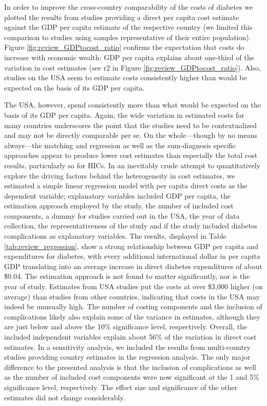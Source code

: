 In order to improve the cross-country comparability of the costs of diabetes we plotted the results from studies providing a direct per capita cost estimate against the \ac{GDP} per capita estimate of the respective country (we limited this comparison to studies using samples representative of their entire population). Figure \ref{fig:review_GDPtocost_ratio} confirms the expectation that costs do increase with economic wealth: \ac{GDP} per capita explains about one-third of the variation in cost estimates (see r2 in Figure \ref{fig:review_GDPtocost_ratio}). Also, studies on the USA seem to estimate costs consistently higher than would be expected on the basis of its \ac{GDP} per capita. 

The USA, however, spend consistently more than what would be expected on the basis of its \ac{GDP} per capita. Again, the wide variation in estimated costs for many countries underscores the point that the studies need to be contextualized and may not be directly comparable per se. On the whole---though by no means always---the matching and regression as well as the sum-diagnosis specific approaches appear to produce lower cost estimates than especially the total cost results, particularly so for \acp{HIC}. In an inevitably crude attempt to quantitatively explore the driving factors behind the heterogeneity in cost estimates, we estimated a simple linear regression model with per capita direct costs as the dependent variable; explanatory variables included \ac{GDP} per capita, the estimation approach employed by the study, the number of included cost components, a dummy for studies carried out in the USA, the year of data collection, the representativeness of the study and if the study included diabetes complications as explanatory variables. The results, displayed in Table \ref{tab:review_regression}, show a strong relationship between \ac{GDP} per capita and expenditures for diabetes, with every additional international dollar in per capita \ac{GDP} translating into an average increase in direct diabetes expenditures of about \$0.04. The estimation approach is not found to matter significantly, nor is the year of study. Estimates from USA studies put the costs at over \$3,000 higher (on average) than studies from other countries, indicating that costs in the USA may indeed be unusually high. The number of costing components and the inclusion of complications likely also explain some of the variance in estimates, although they are just below and above the 10\% significance level, respectively. Overall, the included independent variables explain about 56\% of the variation in direct cost estimates. In a sensitivity analysis, we included the results from multi-country
studies providing country estimates in the regression analysis. The
only major difference to the presented analysis is that the inclusion of
complications as well as the number of included cost components
were now significant at the 1 and 5\% significance level, respectively.
The effect size and significance of the other estimates did not change
considerably.



